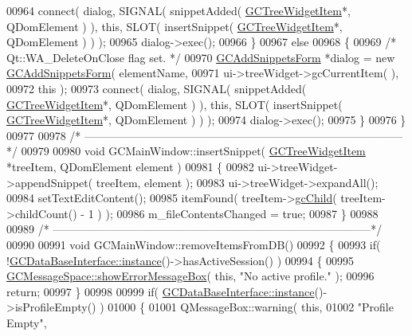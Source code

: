 \begin{DoxyCode}
{{{{{{00964     connect( dialog, SIGNAL( snippetAdded( \hyperlink{class_g_c_tree_widget_item}{GCTreeWidgetItem}*, QDomElement ) ), \textcolor{keyword}{
      this}, SLOT( insertSnippet( \hyperlink{class_g_c_tree_widget_item}{GCTreeWidgetItem}*, QDomElement ) ) );
00965     dialog->exec();
00966   \}
00967   \textcolor{keywordflow}{else}
00968   \{
00969     \textcolor{comment}{/* Qt::WA\_DeleteOnClose flag set. */}
00970     \hyperlink{class_g_c_add_snippets_form}{GCAddSnippetsForm} *dialog = \textcolor{keyword}{new} \hyperlink{class_g_c_add_snippets_form}{GCAddSnippetsForm}( elementName,
00971                                                  ui->treeWidget->gcCurrentItem(
      ),
00972                                                  this );
00973     connect( dialog, SIGNAL( snippetAdded( \hyperlink{class_g_c_tree_widget_item}{GCTreeWidgetItem}*, QDomElement ) ), \textcolor{keyword}{
      this}, SLOT( insertSnippet( \hyperlink{class_g_c_tree_widget_item}{GCTreeWidgetItem}*, QDomElement ) ) );
00974     dialog->exec();
00975   \}
00976 \}
00977 
00978 \textcolor{comment}{/*
      --------------------------------------------------------------------------------------*/}
00979 
00980 \textcolor{keywordtype}{void} GCMainWindow::insertSnippet( \hyperlink{class_g_c_tree_widget_item}{GCTreeWidgetItem} *treeItem, QDomElement 
      element )
00981 \{
00982   ui->treeWidget->appendSnippet( treeItem, element );
00983   ui->treeWidget->expandAll();
00984   setTextEditContent();
00985   itemFound( treeItem->\hyperlink{class_g_c_tree_widget_item_af44c0d2c5eaa1c5bb3a6a1aace3e8c78}{gcChild}( treeItem->childCount() - 1 ) );
00986   m\_fileContentsChanged = \textcolor{keyword}{true};
00987 \}
00988 
00989 \textcolor{comment}{/*
      --------------------------------------------------------------------------------------*/}
00990 
00991 \textcolor{keywordtype}{void} GCMainWindow::removeItemsFromDB()
00992 \{
00993   \textcolor{keywordflow}{if}( !\hyperlink{class_g_c_data_base_interface_a1baea9c0667aa8b610ec30076fcab84c}{GCDataBaseInterface::instance}()->hasActiveSession() )
00994   \{
00995     \hyperlink{namespace_g_c_message_space_ab118b3a133686167617eb955029fd44e}{GCMessageSpace::showErrorMessageBox}( \textcolor{keyword}{this}, \textcolor{stringliteral}{"No active profile."} );
00996     \textcolor{keywordflow}{return};
00997   \}
00998 
00999   \textcolor{keywordflow}{if}( \hyperlink{class_g_c_data_base_interface_a1baea9c0667aa8b610ec30076fcab84c}{GCDataBaseInterface::instance}()->isProfileEmpty() )
01000   \{
01001     QMessageBox::warning( \textcolor{keyword}{this},
01002                           \textcolor{stringliteral}{"Profile Empty"},
}}}}}}
\end{DoxyCode}
